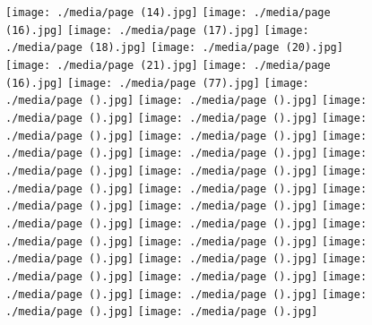 \begin{figure}
    \texttt{[image: ./media/page (14).jpg]}
    \texttt{[image: ./media/page (16).jpg]}
    \texttt{[image: ./media/page (17).jpg]}
    \texttt{[image: ./media/page (18).jpg]}
    \texttt{[image: ./media/page (20).jpg]}
    \texttt{[image: ./media/page (21).jpg]}
    \texttt{[image: ./media/page (16).jpg]}
    \texttt{[image: ./media/page (77).jpg]}
    \texttt{[image: ./media/page ().jpg]}
    \texttt{[image: ./media/page ().jpg]}
    \texttt{[image: ./media/page ().jpg]}
    \texttt{[image: ./media/page ().jpg]}
    \texttt{[image: ./media/page ().jpg]}
    \texttt{[image: ./media/page ().jpg]}
    \texttt{[image: ./media/page ().jpg]}
    \texttt{[image: ./media/page ().jpg]}
    \texttt{[image: ./media/page ().jpg]}
    \texttt{[image: ./media/page ().jpg]}
    \texttt{[image: ./media/page ().jpg]}
    \texttt{[image: ./media/page ().jpg]}
    \texttt{[image: ./media/page ().jpg]}
    \texttt{[image: ./media/page ().jpg]}
    \texttt{[image: ./media/page ().jpg]}
    \texttt{[image: ./media/page ().jpg]}
    \texttt{[image: ./media/page ().jpg]}
    \texttt{[image: ./media/page ().jpg]}
    \texttt{[image: ./media/page ().jpg]}
    \texttt{[image: ./media/page ().jpg]}
    \texttt{[image: ./media/page ().jpg]}
    \texttt{[image: ./media/page ().jpg]}
    \texttt{[image: ./media/page ().jpg]}
    \texttt{[image: ./media/page ().jpg]}
    \texttt{[image: ./media/page ().jpg]}
    \texttt{[image: ./media/page ().jpg]}
\end{figure}